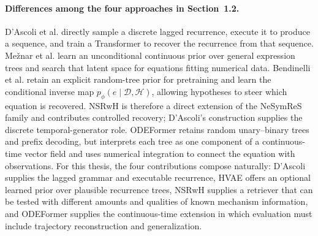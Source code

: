 \paragraph{Differences among the four approaches in Section~1.2.}
D'Ascoli et al. directly sample a discrete lagged recurrence, execute it to
produce a sequence, and train a Transformer to recover the recurrence from that
sequence. Me\v{z}nar et al. learn an unconditional continuous prior over general
expression trees and search that latent space for equations fitting numerical
data. Bendinelli et al. retain an explicit random-tree prior for pretraining and
learn the conditional inverse map
$p_{\phi}(e\mid\mathcal D,\mathcal H)$, allowing hypotheses to steer which
equation is recovered. NSRwH is therefore a direct extension of the NeSymReS
family and contributes controlled recovery; D'Ascoli's construction supplies
the discrete temporal-generator role. ODEFormer retains random unary--binary
trees and prefix decoding, but interprets each tree as one component of a
continuous-time vector field and uses numerical integration to connect the
equation with observations. For this thesis, the four contributions compose
naturally: D'Ascoli supplies the lagged grammar and executable recurrence, HVAE
offers an optional learned prior over plausible recurrence trees, NSRwH supplies
a retriever that can be tested with different amounts and qualities of known
mechanism information, and ODEFormer supplies the continuous-time extension in
which evaluation must include trajectory reconstruction and generalization.

